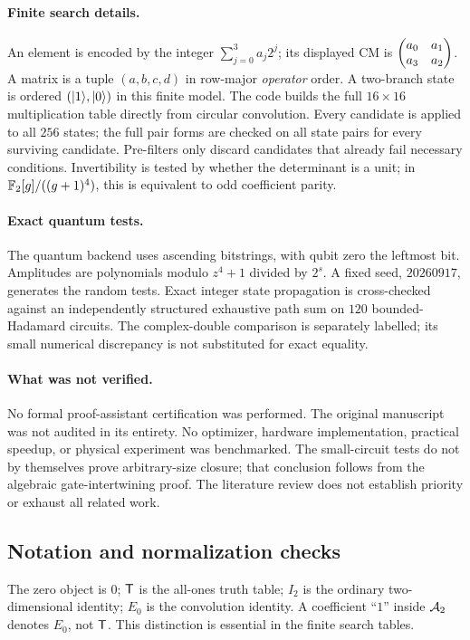 \paragraph{Finite search details.}
An element is encoded by the integer $\sum_{j=0}^3a_j2^j$; its displayed CM is $\begin{pmatrix}a_0&a_1\\a_3&a_2\end{pmatrix}$. A matrix is a tuple $(a,b,c,d)$ in row-major \emph{operator} order. A two-branch state is ordered $(\lvert 1\rangle,\lvert 0\rangle)$ in this finite model. The code builds the full $16\times16$ multiplication table directly from circular convolution. Every candidate is applied to all $256$ states; the full pair forms are checked on all state pairs for every surviving candidate. Pre-filters only discard candidates that already fail necessary conditions. Invertibility is tested by whether the determinant is a unit; in $\mathbb F_2[g]/((g+1)^4)$, this is equivalent to odd coefficient parity.

\paragraph{Exact quantum tests.}
The quantum backend uses ascending bitstrings, with qubit zero the leftmost bit. Amplitudes are polynomials modulo $z^4+1$ divided by $2^s$. A fixed seed, $20260917$, generates the random tests. Exact integer state propagation is cross-checked against an independently structured exhaustive path sum on $120$ bounded-Hadamard circuits. The complex-double comparison is separately labelled; its small numerical discrepancy is not substituted for exact equality.

\paragraph{What was not verified.}
No formal proof-assistant certification was performed. The original manuscript was not audited in its entirety. No optimizer, hardware implementation, practical speedup, or physical experiment was benchmarked. The small-circuit tests do not by themselves prove arbitrary-size closure; that conclusion follows from the algebraic gate-intertwining proof. The literature review does not establish priority or exhaust all related work.

\subsection{Notation and normalization checks}
The zero object is $0$; $\mathsf T$ is the all-ones truth table; $I_2$ is the ordinary two-dimensional identity; $E_0$ is the convolution identity. A coefficient ``$1$'' inside $\mathcal A_2$ denotes $E_0$, not $\mathsf T$. This distinction is essential in the finite search tables.

